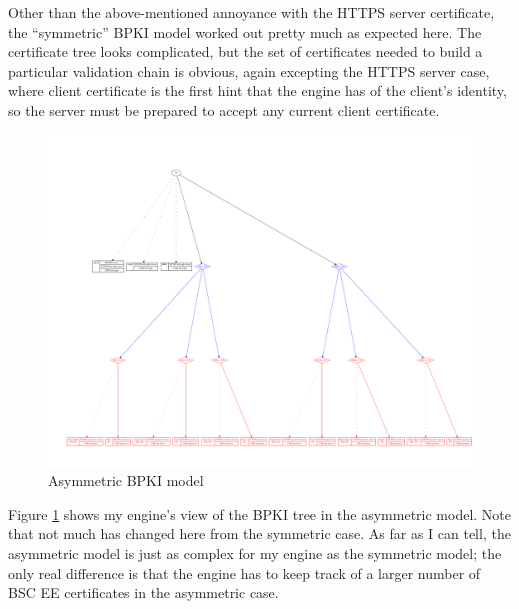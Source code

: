 \documentclass[11pt]{article}
\begin{document}
Other than the above-mentioned annoyance with the HTTPS server
certificate, the ``symmetric'' BPKI model worked out pretty much as
expected here.  The certificate tree looks complicated, but the set of
certificates needed to build a particular validation chain is obvious,
again excepting the HTTPS server case, where client certificate is the
first hint that the engine has of the client's identity, so the server
must be prepared to accept any current client certificate.

\begin{figure}[hbp]
\includegraphics[width = 6.5in]{bpki-asymmetric}
\caption{Asymmetric BPKI model}
\label{bpki-asymmetric}
\end{figure}

Figure \ref{bpki-asymmetric} shows my engine's view of the BPKI tree
in the asymmetric model.  Note that not much has changed here from the
symmetric case.  As far as I can tell, the asymmetric model is just as
complex for my engine as the symmetric model; the only real difference
is that the engine has to keep track of a larger number of BSC EE
certificates in the asymmetric case.
\end{document}
